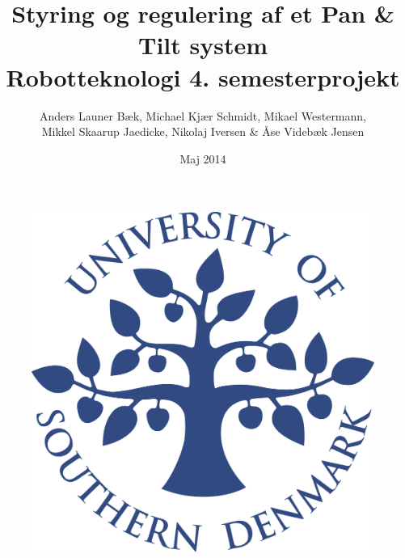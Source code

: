 \title{Styring og regulering af et Pan \& Tilt system \\Robotteknologi 4. semesterprojekt}
\author{Anders Launer Bæk, Michael Kjær Schmidt, Mikael Westermann, \\Mikkel Skaarup Jaedicke, Nikolaj Iversen \& Åse Videbæk Jensen}
\date{Maj 2014}
\begin{figure}
\centering
\includegraphics[width=1\textwidth]{graphics/forside.png}
\end{figure}
\maketitle

